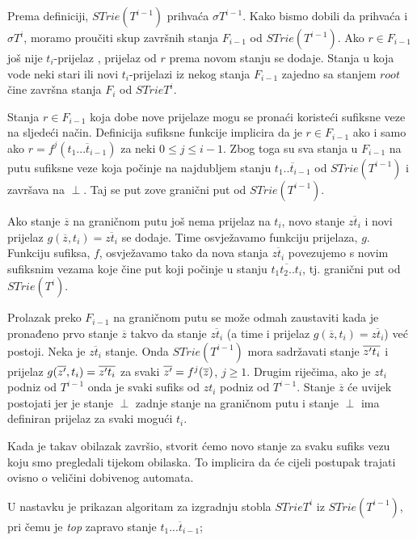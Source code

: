 \documentclass[times, utf8, seminar, numeric]{fer}
\begin{document}
	Prema definiciji, $STrie(T^{i-1})$ prihvaća $\sigma{T^{i-1}}$. Kako bismo dobili da prihvaća i $\sigma{T^{i}}$, moramo proučiti skup završnih stanja $F_{i-1}$ od $STrie(T^{i-1})$. Ako $r \in F_{i-1}$ još nije $t_{i}$-prijelaz , prijelaz od $r$ prema novom stanju se dodaje. Stanja u koja vode neki stari ili novi $t_{i}$-prijelazi iz nekog stanja $F_{i-1}$ zajedno sa stanjem $root$ čine završna stanja $F_i$ od $STrie{T^{i}}$.
	
	Stanja $r \in F_{i-1}$ koja dobe nove prijelaze mogu se pronaći koristeći sufiksne veze na sljedeći način. Definicija sufiksne funkcije implicira da je $r \in F_{i-1}$ ako i samo ako $r = f^{j} (\overline{t_1 ... t_{i-1}}) $ za neki $0 \le j \le i-1$. Zbog toga su sva stanja u $F_{i-1}$ na putu sufiksne veze koja počinje na najdubljem stanju $\overline{t_1 .. t_{i-1}}$ od $STrie(T^{i-1})$ i završava na $\perp$. Taj se put zove granični put  od $STrie(T^{i-1})$.
	
	Ako stanje $\overline{z}$ na graničnom putu još nema prijelaz na $t_i$, novo stanje $\overline{z t_i}$ i novi prijelaz $g(\overline{z}, t_i) = \overline{z t_i}$ se dodaje. Time osvježavamo funkciju prijelaza, $g$. Funkciju sufiksa, $f$, osvježavamo tako da nova stanja $\overline{z t_i}$ povezujemo s novim sufiksnim vezama koje čine put koji počinje u stanju $\overline{t_1 t_2 .. t_i}$, tj. granični put od $STrie(T^i)$. 
	
	Prolazak preko $F_{i-1}$ na graničnom putu se može odmah zaustaviti kada je pronađeno prvo stanje $\overline{z}$ takvo da stanje $\overline{z t_i}$ (a time i prijelaz $g(\overline{z}, t_i) = \overline{z t_i}$) već postoji. Neka je $\overline{z t_i}$ stanje. Onda $STrie(T^{i-1})$ mora sadržavati stanje $\overline{z\rq{} t_i}$ i prijelaz $g(\overline{z\rq{}}, t_i) = \overline{z\rq{} t_i}$ za svaki $\overline{z\rq{}} = f^j(\overline{z})$, $j \ge 1$. Drugim riječima, ako je $z t_i$ podniz od $T^{i-1}$ onda je svaki sufiks od $z t_i$ podniz od $T^{i-1}$. Stanje $\overline{z}$ će uvijek postojati jer je stanje $\perp$ zadnje stanje na graničnom putu i stanje $\perp$ ima definiran prijelaz za svaki mogući $t_i$.
	
	Kada je takav obilazak završio, stvorit ćemo novo stanje za svaku sufiks vezu koju smo pregledali tijekom obilaska. To implicira da će cijeli postupak trajati ovisno o veličini dobivenog automata.
	
	U nastavku je prikazan algoritam za izgradnju stobla $STrie{T^i}$ iz $STrie(T^{i-1})$, pri čemu je \textit{top} zapravo stanje $\overline{t_1 ... t_{i-1}}$;
	
\end{document}
